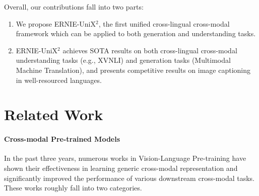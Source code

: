 \documentclass{article}
\begin{document}
Overall, our contributions fall into two parts: 
\begin{enumerate}
\item We propose ERNIE-UniX$^{2}$, the first unified cross-lingual cross-modal framework which can be applied to both generation and understanding tasks.
\item ERNIE-UniX$^{2}$ achieves SOTA results on both cross-lingual cross-modal understanding tasks (e.g., XVNLI) and generation tasks (Multimodal Machine Translation), and presents competitive results on image captioning in well-resourced languages. 
\end{enumerate}

\section{Related Work}
\paragraph{Cross-modal Pre-trained Models}
In the past three years, numerous works \cite{vilbert2019,chen2020uniter,simvlm2021,Li2020OscarOA,Kim2021ViLTVT,Jia2021ScalingUV,dou2022an} in Vision-Language Pre-training have shown their effectiveness in learning generic cross-modal representation and significantly improved the performance of various downstream cross-modal tasks. These works roughly fall into two categories. 
\end{document}
